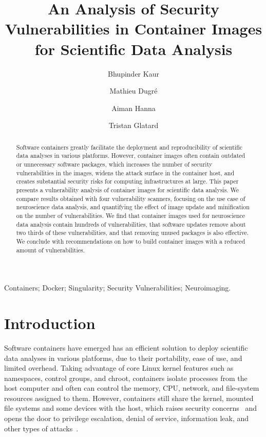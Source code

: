 \documentclass[a4paper,num-refs]{oup-contemporary}
\title{An Analysis of Security Vulnerabilities in Container Images for Scientific Data Analysis}
\newcommand{\revision}[1]{\color{ao(english)}#1\color{black}\xspace}
\begin{document}
\author{Bhupinder Kaur}
\author{Mathieu Dugr\'e}
\author{Aiman Hanna}
\author{Tristan Glatard}


\maketitle

\begin{abstract}
Software containers greatly facilitate the deployment and reproducibility
of scientific data analyses \revision{in various platforms.} However,
container images often contain outdated or unnecessary software packages,
which increases the number of security vulnerabilities in the images,
widens the attack surface \revision{in the container host, and creates
substantial security risks for computing infrastructures at large}. This paper
presents a vulnerability analysis of container images for scientific data
analysis. We compare results obtained with four vulnerability scanners,
focusing on the use case of neuroscience data analysis, and quantifying the
effect of image update and minification on the number of vulnerabilities.
We find that container images used for neuroscience data analysis contain
hundreds of vulnerabilities, that software updates remove about two thirds
of these vulnerabilities, and that removing unused packages is also
effective. We conclude with recommendations on how to build container
images with a reduced amount of vulnerabilities.

\end{abstract}

\begin{keywords}
Containers; Docker; Singularity; Security Vulnerabilities; Neuroimaging.
\end{keywords}

\section{Introduction}

Software containers have emerged has an efficient solution to deploy
scientific data analyses \revision{in various platforms}, due
to their portability, ease of use, and limited overhead. 
Taking advantage of core Linux kernel features such as namespaces, control
groups\revision{,} and chroot, containers isolate processes from the host computer and \revision{often can}
control the memory, CPU, network\revision{,} and file-system resources assigned to
them. However, containers still share the kernel, mounted file systems and
some devices with the host, which raises security
concerns~\cite{martin2018docker, sultan2019container, combe2016docker} and
opens the door to privilege escalation, denial of service, information leak\revision{,}
and other types of attacks~\cite{gantikow2016providing}. 
\end{document}
